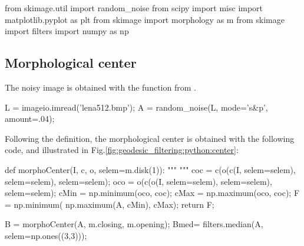 \def\QRCODE{MASTER_mispa_TUT.IMG.morphological_geodesic_filtering_pythonqrcode.png}
\def\QRPAGE{http://www.iptutorials.science/tree/master/MASTER_mispa/TUT.IMG.morphological_geodesic_filtering/python}

\begin{python}
from skimage.util import random_noise
from scipy import misc
import matplotlib.pyplot as plt
from skimage import morphology as m
from skimage import filters
import numpy as np
\end{python}

\subsection{Morphological center}
The noisy image is obtained with the function  from .

\begin{python}
L = imageio.imread('lena512.bmp');
A = random_noise(L, mode='s&p', amount=.04);
\end{python}

Following the definition, the morphological center is obtained with the following code, and illustrated in Fig.\ref{fig:geodesic_filtering:python:center}:
\begin{python}
def morphoCenter(I, c, o, selem=m.disk(1)):
    """
    """
    coc = c(o(c(I, selem=selem), selem=selem), selem=selem);
    oco = o(c(o(I, selem=selem), selem=selem), selem=selem);
    cMin = np.minimum(oco, coc);
    cMax = np.maximum(oco, coc);
    F = np.minimum( np.maximum(A, cMin), cMax);
    return F;

B = morphoCenter(A, m.closing, m.opening);
Bmed= filters.median(A, selem=np.ones((3,3)));
\end{python}

